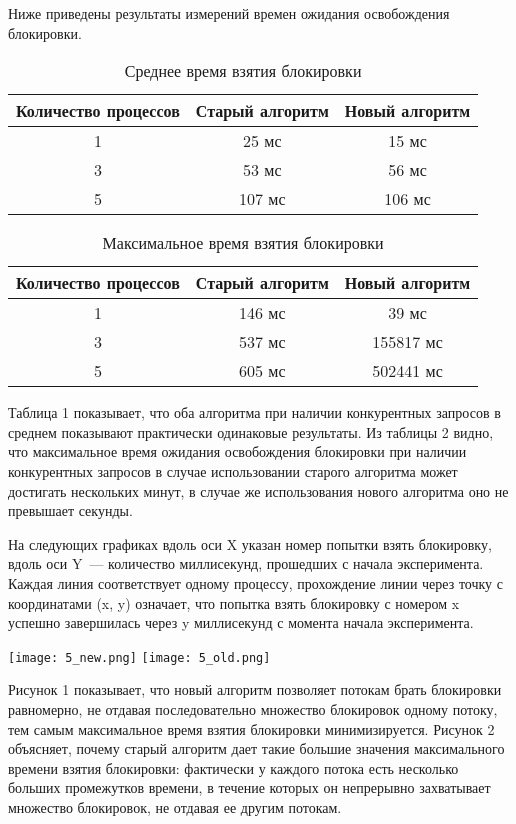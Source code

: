 Ниже приведены результаты измерений времен ожидания освобождения блокировки.

\begin{table}[H]
\caption{\label{tab:summary}Среднее время взятия блокировки}
\begin{center}
\begin{tabular}{|c|c|c|}
\hline
Количество процессов & Старый алгоритм & Новый алгоритм \\
\hline
1 & 25 мс & 15 мс \\
\hline
3 & 53 мс & 56 мс \\
\hline
5 & 107 мс & 106 мс \\
\hline
\end{tabular}
\end{center}

\end{table} \begin{table}[H]
\caption{\label{tab:summary}Максимальное время взятия блокировки}
\begin{center}
\begin{tabular}{|c|c|c|}
\hline
Количество процессов & Старый алгоритм & Новый алгоритм \\
\hline
1 & 146 мс & 39 мс \\
\hline
3 & 537 мс & 155817 мс \\
\hline
5 & 605 мс & 502441 мс \\
\hline
\end{tabular}
\end{center}
\end{table} 

Таблица 1 показывает, что оба алгоритма при наличии конкурентных запросов в среднем показывают практически одинаковые результаты.
Из таблицы 2 видно, что максимальное время ожидания освобождения блокировки при наличии конкурентных запросов в случае использовании старого алгоритма может достигать нескольких минут, в случае же использования нового алгоритма оно не превышает секунды.

На следующих графиках вдоль оси X указан номер попытки взять блокировку, вдоль оси Y~--- количество миллисекунд, прошедших с начала эксперимента. Каждая линия соответствует одному процессу, прохождение линии через точку с координатами (x, y) означает, что попытка взять блокировку с номером x успешно завершилась через y миллисекунд с момента начала эксперимента.

\texttt{[image: 5\_new.png]}
\texttt{[image: 5\_old.png]}

Рисунок 1 показывает, что новый алгоритм позволяет потокам брать блокировки равномерно, не отдавая последовательно множество блокировок одному потоку, тем самым максимальное время взятия блокировки минимизируется. Рисунок 2 объясняет, почему старый алгоритм дает такие большие значения максимального времени взятия блокировки: фактически у каждого потока есть несколько больших промежутков времени, в течение которых он непрерывно захватывает множество блокировок, не отдавая ее другим потокам.

